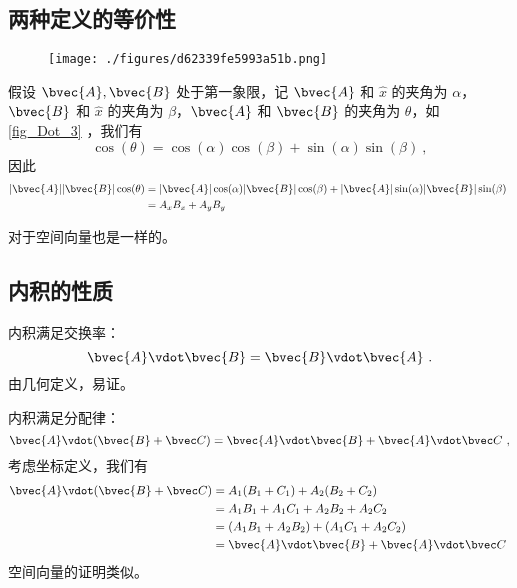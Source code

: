 \subsection{两种定义的等价性}


\begin{figure}[ht]
\centering
\texttt{[image: ./figures/d62339fe5993a51b.png]}
\caption{} \label{fig_Dot_3}
\end{figure}
假设 $\bvec{A}, \bvec{B}$ 处于第一象限，记 $\bvec{A}$ 和 $\hat{x}$ 的夹角为 $\alpha$，$\bvec{B}$ 和 $\hat{x}$ 的夹角为 $\beta$，$\bvec{A}$ 和 $\bvec{B}$ 的夹角为 $\theta$，如\autoref{fig_Dot_3} ，我们有
\begin{equation}
\cos(\theta) = \cos(\alpha) \cos(\beta) + \sin(\alpha) \sin(\beta)~,
\end{equation}
因此
\begin{equation}
\begin{aligned}
|\bvec{A}| |\bvec{B}| \cos(\theta) &= |\bvec{A}| \cos(\alpha) |\bvec{B}| \cos(\beta) + |\bvec{A}| \sin(\alpha) |\bvec{B}| \sin(\beta) \\
&= A_x B_x + A_y B_y
\end{aligned}~
\end{equation}


对于空间向量也是一样的。

\subsection{内积的性质}

内积满足交换率：
\begin{equation}\label{eq_Dot_2}
\bvec{A} \vdot \bvec{B} = \bvec{B} \vdot \bvec{A}~.
\end{equation}
由几何定义，易证。

内积满足分配律：
\begin{equation}\label{eq_Dot_3}
\bvec{A} \vdot (\bvec{B} + \bvec C) = \bvec{A} \vdot \bvec{B} + \bvec{A} \vdot \bvec C~,
\end{equation}
考虑坐标定义，我们有
\begin{equation}
\begin{aligned}
\bvec{A} \vdot (\bvec{B} + \bvec C) &= A_1 (B_1 + C_1) + A_2 (B_2 + C_2) \\
&= A_1 B_1 + A_1 C_1 + A_2 B_2 + A_2 C_2 \\
&= (A_1 B_1 + A_2 B_2) + (A_1 C_1 + A_2 C_2) \\
&= \bvec{A} \vdot \bvec{B} + \bvec{A} \vdot \bvec C
\end{aligned}~
\end{equation}
空间向量的证明类似。

